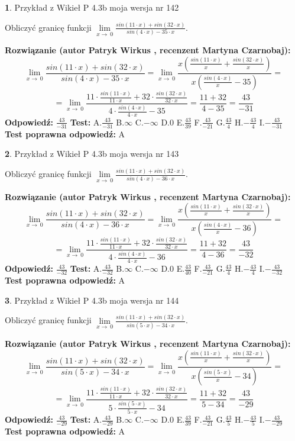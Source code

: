 \documentclass[12pt, a4paper]{article}
\theoremstyle{definition} %
\newtheorem{zad}{}
\newcommand{\zadStart}[1]{\begin{zad}#1\newline}
\newcommand{\zadStop}{\end{zad}}
\newcommand{\rozwStart}[2]{\noindent \textbf{Rozwiązanie (autor #1 , recenzent #2): }\newline}
\newcommand{\rozwStop}{\newline}
\newcommand{\odpStart}{\noindent \textbf{Odpowiedź:}\newline}
\newcommand{\odpStop}{\newline}
\newcommand{\testStart}{\noindent \textbf{Test:}\newline}
\newcommand{\testStop}{\newline}
\newcommand{\kluczStart}{\noindent \textbf{Test poprawna odpowiedź:}\newline}
\newcommand{\kluczStop}{\newline}
\begin{document}
\zadStart{Przykład z Wikieł P 4.3b moja wersja nr 142}


Obliczyć granicę funkcji $\lim\limits_{x\to\ 0}\frac{sin(11 \cdot x)+sin(32 \cdot x)}{sin(4 \cdot x)-35 \cdot x}$.
\zadStop
\rozwStart{Patryk Wirkus}{Martyna Czarnobaj}
$$\lim\limits_{x\to\ 0}\frac{sin(11 \cdot x)+sin(32 \cdot x)}{sin(4 \cdot x)-35 \cdot x}=\lim\limits_{x\to\ 0}\frac{x(\frac{sin(11 \cdot x)}{x}+\frac{sin(32 \cdot x)}{x})}{x(\frac{sin(4 \cdot x)}{x}-35)}=$$
$$=\lim\limits_{x\to\ 0}\frac{11 \cdot \frac{sin(11 \cdot x)}{11 \cdot x}+32 \cdot \frac{sin(32 \cdot x)}{32 \cdot x}}{4 \cdot \frac{sin(4 \cdot x)}{4 \cdot x}-35}=\frac{11+32}{4-35} = \frac{43}{-31}$$
\rozwStop
\odpStart
$\frac{43}{-31}$
\odpStop
\testStart
A.$\frac{43}{-31}$
B.$\infty$
C.$-\infty$
D.$0$
E.$\frac{43}{39}$
F.$\frac{43}{-21}$
G.$\frac{43}{4}$
H.$-\frac{43}{4}$
I.$-\frac{43}{-31}$
\testStop
\kluczStart
A
\kluczStop



\zadStart{Przykład z Wikieł P 4.3b moja wersja nr 143}


Obliczyć granicę funkcji $\lim\limits_{x\to\ 0}\frac{sin(11 \cdot x)+sin(32 \cdot x)}{sin(4 \cdot x)-36 \cdot x}$.
\zadStop
\rozwStart{Patryk Wirkus}{Martyna Czarnobaj}
$$\lim\limits_{x\to\ 0}\frac{sin(11 \cdot x)+sin(32 \cdot x)}{sin(4 \cdot x)-36 \cdot x}=\lim\limits_{x\to\ 0}\frac{x(\frac{sin(11 \cdot x)}{x}+\frac{sin(32 \cdot x)}{x})}{x(\frac{sin(4 \cdot x)}{x}-36)}=$$
$$=\lim\limits_{x\to\ 0}\frac{11 \cdot \frac{sin(11 \cdot x)}{11 \cdot x}+32 \cdot \frac{sin(32 \cdot x)}{32 \cdot x}}{4 \cdot \frac{sin(4 \cdot x)}{4 \cdot x}-36}=\frac{11+32}{4-36} = \frac{43}{-32}$$
\rozwStop
\odpStart
$\frac{43}{-32}$
\odpStop
\testStart
A.$\frac{43}{-32}$
B.$\infty$
C.$-\infty$
D.$0$
E.$\frac{43}{40}$
F.$\frac{43}{-21}$
G.$\frac{43}{4}$
H.$-\frac{43}{4}$
I.$-\frac{43}{-32}$
\testStop
\kluczStart
A
\kluczStop



\zadStart{Przykład z Wikieł P 4.3b moja wersja nr 144}


Obliczyć granicę funkcji $\lim\limits_{x\to\ 0}\frac{sin(11 \cdot x)+sin(32 \cdot x)}{sin(5 \cdot x)-34 \cdot x}$.
\zadStop
\rozwStart{Patryk Wirkus}{Martyna Czarnobaj}
$$\lim\limits_{x\to\ 0}\frac{sin(11 \cdot x)+sin(32 \cdot x)}{sin(5 \cdot x)-34 \cdot x}=\lim\limits_{x\to\ 0}\frac{x(\frac{sin(11 \cdot x)}{x}+\frac{sin(32 \cdot x)}{x})}{x(\frac{sin(5 \cdot x)}{x}-34)}=$$
$$=\lim\limits_{x\to\ 0}\frac{11 \cdot \frac{sin(11 \cdot x)}{11 \cdot x}+32 \cdot \frac{sin(32 \cdot x)}{32 \cdot x}}{5 \cdot \frac{sin(5 \cdot x)}{5 \cdot x}-34}=\frac{11+32}{5-34} = \frac{43}{-29}$$
\rozwStop
\odpStart
$\frac{43}{-29}$
\odpStop
\testStart
A.$\frac{43}{-29}$
B.$\infty$
C.$-\infty$
D.$0$
E.$\frac{43}{39}$
F.$\frac{43}{-21}$
G.$\frac{43}{5}$
H.$-\frac{43}{5}$
I.$-\frac{43}{-29}$
\testStop
\kluczStart
A
\kluczStop
\end{document}
